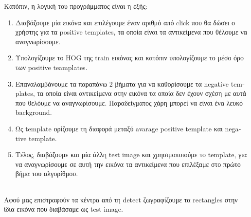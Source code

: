 \documentclass{article}
\newcommand{\tl}[1]{\textlatin{#1}}
\begin{document}
\begin{enumerate}[label=\arabic*.]
		\noindent
		Κατόπιν, η λογική του προγράμματος είναι η εξής: 
		\begin{enumerate}[label=\arabic*.]
			\item Διαβάζουμε μία εικόνα και επιλέγουμε έναν αριθμό από \tl{click} που θα δώσει ο χρήστης για τα \tl{positive templates}, τα οποία είναι τα αντικείμενα που θέλουμε 
			να αναγνωρίσουμε.
			\item Υπολογίζουμε το \tl{HOG} της \tl{train} εικόνας και κατόπιν υπολογίζουμε το μέσο όρο των \tl{positive teamplates}. 
			\item Επαναλαμβάνουμε τα παραπάνω 2 βήματα για να καθορίσουμε τα \tl{negative templates}, τα οποία είναι αντικείμενα στην εικόνα τα οποία δεν έχουν σχέση με αυτά που 
			θελόυμε να αναγνωρίσουμε. Παραδείγματος χάρη μπορεί να είναι ένα λευκό \tl{background}.
			\item Ως \tl{template} ορίζουμε τη διαφορά μεταξύ \tl{avarage positive template} και \tl{negative template}.
			\item Τέλος, διαβάζουμε και μία άλλη \tl{test image} και χρησιμοποιούμε το \tl{template}, για να αναγνωρίσουμε σε αυτή την εικόνα τα αντικείμενα που επιλέξαμε στο πρώτο 
			βήμα του αλγορίθμου.
		\end{enumerate}
		\ \\
		\noindent
		Αφού μας επιστραφούν τα κέντρα από τη \tl{detect} ζωγραφίζουμε τα \tl{rectangles} στην ίδια εικόνα που διαβάσαμε ως \tl{test image}.
	\end{enumerate}
\end{document}
